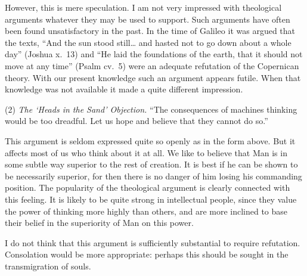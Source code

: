 \documentclass[10pt]{article} %
\begin{document}
However, this is mere speculation. I am not very impressed with theological arguments whatever they may be used to support. Such arguments have often been found unsatisfactory in the past. In the time of Galileo it was argued that the texts, ``And the sun stood still\dots{} and hasted not to go down about a whole day'' (Joshua x.~13) and ``He laid the foundations of the earth, that it should not move at any time'' (Psalm cv.~5) were an adequate refutation of the Copernican theory. With our present knowledge such an argument appears futile. When that knowledge was not available it made a quite different impression.
\vspace{0.5\baselineskip} %

\noindent\normalfont (2) \textit{The `Heads in the Sand' Objection.} ``The consequences of machines thinking would be too dreadful. Let us hope and believe that they cannot do so.''

This argument is seldom expressed quite so openly as in the form above. But it affects most of us who think about it at all. We like to believe that Man is in some subtle way superior to the rest of creation. It is best if he can be shown to be necessarily superior, for then there is no danger of him losing his commanding position. The popularity of the theological argument is clearly connected with this feeling. It is likely to be quite strong in intellectual people, since they value the power of thinking more highly than others, and are more inclined to base their belief in the superiority of Man on this power.

I do not think that this argument is sufficiently substantial to require refutation. Consolation would be more appropriate: perhaps this should be sought in the transmigration of souls.
\vspace{0.5\baselineskip} %
\end{document}

